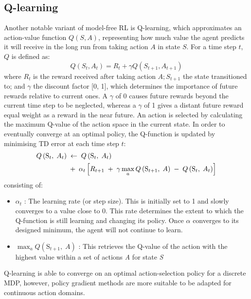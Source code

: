 \documentclass[10pt,journal,compsoc]{IEEEtran}
\begin{document}
\subsection{Q-learning}
Another notable variant of model-free RL is Q-learning\cite{watkins1989learning}, which approximates an action-value function $Q(S, A)$, representing how much value the agent predicts it will receive in the long run from taking action $A$ in state $S$. For a time step $t$, $Q$ is defined as:
\begin{equation}
Q(S_t, A_t) = R_t + \gamma Q(S_{t+1}, A_{t+1})
\end{equation}
where $R_t$ is the reward received after taking action $A; S_{t+1}$ the state transitioned to; and $\gamma$ the discount factor [0, 1], which determines the importance of future rewards relative to current ones.  A \(\gamma\) of 0 causes future rewards beyond the current time step to be neglected, whereas a \(\gamma\) of 1 gives a distant future reward equal weight as a reward in the near future. An action is selected by calculating the maximum Q-value of the action space in the current state. In order to eventually converge at an optimal policy, the Q-function is updated by minimising TD error at each time step $t$:
\begin{align}
Q\left( \mbox{S}_{t},\; A_{t} \right)\; &\leftarrow\;Q\left( \mbox{S}_{t},\; A_{t} \right)\; \notag \\
 &+\; \alpha_{t}\left[ R_{t+1}\; +\; \gamma \max _{a}Q\left( \mbox{S}_{t+1},\; A \right)\; -\; Q\left( \mbox{S}_{t},\; A_{t} \right) \right]
\end{align}
\indent
consisting of:
\begin{itemize}
\item \({{\alpha}}_{{t}}\) : The learning rate (or step size). This is initially set to 1 and slowly converges to a value close to 0. This rate determines the extent to which the Q-function is still learning and changing its policy. Once $\alpha$ converges to its designed minimum, the agent will not continue to learn.
\item \(\max _{a}Q\left( \mbox{S}_{t+1},\; A \right)\) : This retrieves the Q-value of the action with the highest value within a set of actions \textit{A} for state \textit{S}
\end{itemize}


Q-learning is able to converge on an optimal action-selection policy for a discrete MDP, however, policy gradient methods are more suitable to be adapted for continuous action domains.
\end{document}
